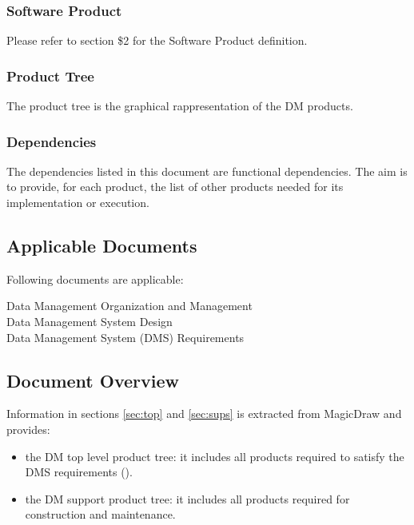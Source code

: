 \subsubsection{Software Product} \label{sec:swproduct}

Please refer to  section \$2 for the Software Product definition.


\subsubsection{Product Tree} \label{sec:ptree}

The product tree is the graphical rappresentation of the DM products.


\subsubsection{Dependencies} \label{sec:dependencies}

The dependencies listed in this document are functional dependencies.
The aim is to provide, for each product, the list of other products needed for its implementation or execution. 


\subsection{Applicable Documents}

Following documents are applicable:

 Data Management Organization and Management\\
 Data Management System Design\\
 Data Management System (DMS) Requirements


\subsection{Document Overview}

Information in sections \ref{sec:top} and \ref{sec:sups} is extracted from MagicDraw and provides:

\begin{itemize}
\item the DM top level product tree: it includes all products required to satisfy the DMS requirements ().
\item the DM support product tree: it includes all products required for construction and maintenance.
\end{itemize}

